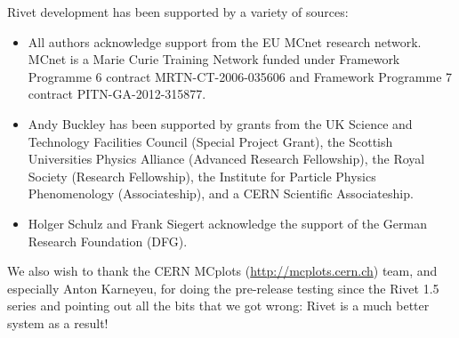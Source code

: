Rivet development has been supported by a variety of sources:

\begin{itemize}
\item All authors acknowledge support from the EU MCnet research network. MCnet
  is a Marie Curie Training Network funded under Framework Programme 6
  contract MRTN-CT-2006-035606 and Framework Programme 7 contract PITN-GA-2012-315877.
\item Andy Buckley has been supported by grants from the UK Science and
  Technology Facilities Council (Special Project Grant), the Scottish
  Universities Physics Alliance (Advanced Research Fellowship), 
  the Royal Society (Research Fellowship), the Institute
  for Particle Physics Phenomenology (Associateship), and a CERN Scientific
  Associateship.
\item Holger Schulz and Frank Siegert acknowledge the support of the German
  Research Foundation (DFG).
\end{itemize}

We also wish to thank the CERN MCplots (\url{http://mcplots.cern.ch}) team, and
especially Anton Karneyeu, for doing the pre-release testing since the Rivet 1.5
series and pointing out all the bits that we got wrong: Rivet is a much better
system as a result!
